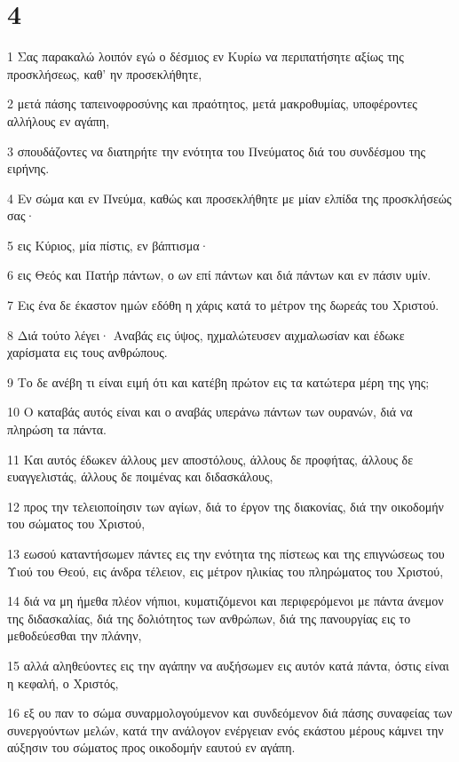 \chapter{4}

\par 1 Σας παρακαλώ λοιπόν εγώ ο δέσμιος εν Κυρίω να περιπατήσητε αξίως της προσκλήσεως, καθ' ην προσεκλήθητε,
\par 2 μετά πάσης ταπεινοφροσύνης και πραότητος, μετά μακροθυμίας, υποφέροντες αλλήλους εν αγάπη,
\par 3 σπουδάζοντες να διατηρήτε την ενότητα του Πνεύματος διά του συνδέσμου της ειρήνης.
\par 4 Εν σώμα και εν Πνεύμα, καθώς και προσεκλήθητε με μίαν ελπίδα της προσκλήσεώς σας·
\par 5 εις Κύριος, μία πίστις, εν βάπτισμα·
\par 6 εις Θεός και Πατήρ πάντων, ο ων επί πάντων και διά πάντων και εν πάσιν υμίν.
\par 7 Εις ένα δε έκαστον ημών εδόθη η χάρις κατά το μέτρον της δωρεάς του Χριστού.
\par 8 Διά τούτο λέγει· Αναβάς εις ύψος, ηχμαλώτευσεν αιχμαλωσίαν και έδωκε χαρίσματα εις τους ανθρώπους.
\par 9 Το δε ανέβη τι είναι ειμή ότι και κατέβη πρώτον εις τα κατώτερα μέρη της γης;
\par 10 Ο καταβάς αυτός είναι και ο αναβάς υπεράνω πάντων των ουρανών, διά να πληρώση τα πάντα.
\par 11 Και αυτός έδωκεν άλλους μεν αποστόλους, άλλους δε προφήτας, άλλους δε ευαγγελιστάς, άλλους δε ποιμένας και διδασκάλους,
\par 12 προς την τελειοποίησιν των αγίων, διά το έργον της διακονίας, διά την οικοδομήν του σώματος του Χριστού,
\par 13 εωσού καταντήσωμεν πάντες εις την ενότητα της πίστεως και της επιγνώσεως του Υιού του Θεού, εις άνδρα τέλειον, εις μέτρον ηλικίας του πληρώματος του Χριστού,
\par 14 διά να μη ήμεθα πλέον νήπιοι, κυματιζόμενοι και περιφερόμενοι με πάντα άνεμον της διδασκαλίας, διά της δολιότητος των ανθρώπων, διά της πανουργίας εις το μεθοδεύεσθαι την πλάνην,
\par 15 αλλά αληθεύοντες εις την αγάπην να αυξήσωμεν εις αυτόν κατά πάντα, όστις είναι η κεφαλή, ο Χριστός,
\par 16 εξ ου παν το σώμα συναρμολογούμενον και συνδεόμενον διά πάσης συναφείας των συνεργούντων μελών, κατά την ανάλογον ενέργειαν ενός εκάστου μέρους κάμνει την αύξησιν του σώματος προς οικοδομήν εαυτού εν αγάπη.
